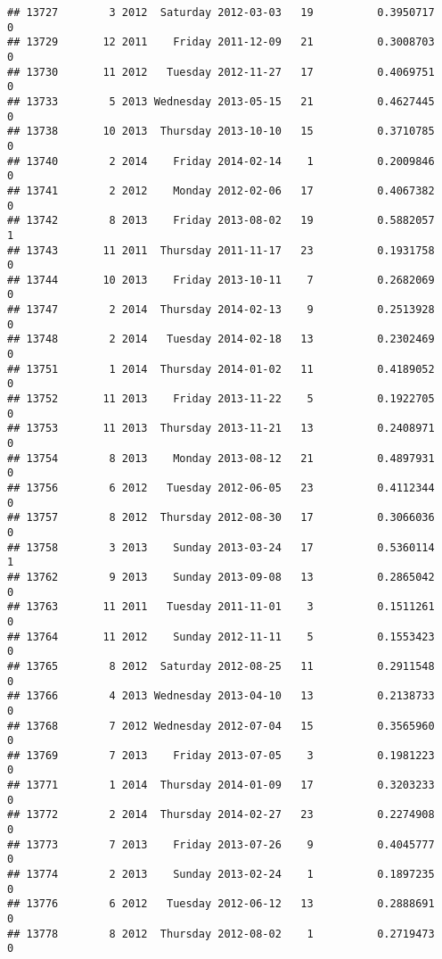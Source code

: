 \documentclass[
]{article}
\begin{document}
\begin{verbatim}
## 13727        3 2012  Saturday 2012-03-03   19          0.3950717             0
## 13729       12 2011    Friday 2011-12-09   21          0.3008703             0
## 13730       11 2012   Tuesday 2012-11-27   17          0.4069751             0
## 13733        5 2013 Wednesday 2013-05-15   21          0.4627445             0
## 13738       10 2013  Thursday 2013-10-10   15          0.3710785             0
## 13740        2 2014    Friday 2014-02-14    1          0.2009846             0
## 13741        2 2012    Monday 2012-02-06   17          0.4067382             0
## 13742        8 2013    Friday 2013-08-02   19          0.5882057             1
## 13743       11 2011  Thursday 2011-11-17   23          0.1931758             0
## 13744       10 2013    Friday 2013-10-11    7          0.2682069             0
## 13747        2 2014  Thursday 2014-02-13    9          0.2513928             0
## 13748        2 2014   Tuesday 2014-02-18   13          0.2302469             0
## 13751        1 2014  Thursday 2014-01-02   11          0.4189052             0
## 13752       11 2013    Friday 2013-11-22    5          0.1922705             0
## 13753       11 2013  Thursday 2013-11-21   13          0.2408971             0
## 13754        8 2013    Monday 2013-08-12   21          0.4897931             0
## 13756        6 2012   Tuesday 2012-06-05   23          0.4112344             0
## 13757        8 2012  Thursday 2012-08-30   17          0.3066036             0
## 13758        3 2013    Sunday 2013-03-24   17          0.5360114             1
## 13762        9 2013    Sunday 2013-09-08   13          0.2865042             0
## 13763       11 2011   Tuesday 2011-11-01    3          0.1511261             0
## 13764       11 2012    Sunday 2012-11-11    5          0.1553423             0
## 13765        8 2012  Saturday 2012-08-25   11          0.2911548             0
## 13766        4 2013 Wednesday 2013-04-10   13          0.2138733             0
## 13768        7 2012 Wednesday 2012-07-04   15          0.3565960             0
## 13769        7 2013    Friday 2013-07-05    3          0.1981223             0
## 13771        1 2014  Thursday 2014-01-09   17          0.3203233             0
## 13772        2 2014  Thursday 2014-02-27   23          0.2274908             0
## 13773        7 2013    Friday 2013-07-26    9          0.4045777             0
## 13774        2 2013    Sunday 2013-02-24    1          0.1897235             0
## 13776        6 2012   Tuesday 2012-06-12   13          0.2888691             0
## 13778        8 2012  Thursday 2012-08-02    1          0.2719473             0

\end{verbatim}
\end{document}
